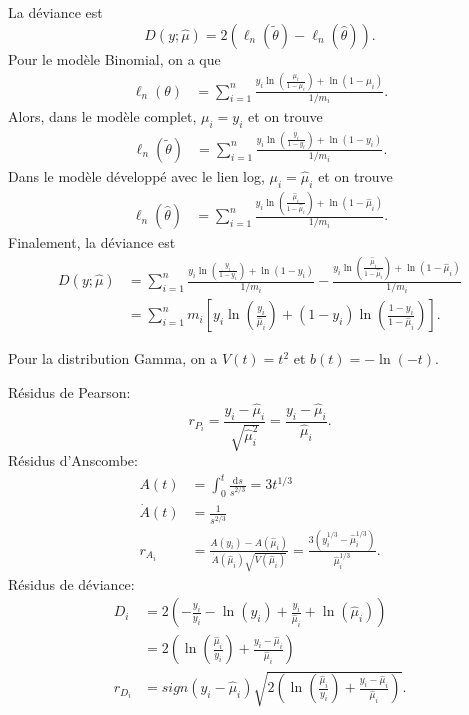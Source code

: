 \begin{solution}{2.5}
La déviance est $$D(y;\hat{\mu})=2(\ell_n(\tilde{\theta})-\ell_n(\hat{\theta})).$$ Pour le modèle Binomial, on a que
\begin{align*}
\ell_n(\theta)&=\sum_{i=1}^n\frac{y_i\ln\left(\frac{\mu_i}{1-\mu_i}\right)+\ln(1-\mu_i)}{1/m_i}.
\end{align*} Alors, dans le modèle complet, $\mu_i=y_i$ et on trouve
\begin{align*}
\ell_n(\tilde{\theta})&=\sum_{i=1}^n\frac{y_i\ln\left(\frac{y_i}{1-y_i}\right)+\ln(1-y_i)}{1/m_i}.
\end{align*}
Dans le modèle développé avec le lien log, $\mu_i=\hat{\mu}_i$ et on trouve
\begin{align*}
\ell_n(\hat{\theta})&=\sum_{i=1}^n\frac{y_i\ln\left(\frac{\hat{\mu}_i}{1-\hat{\mu}_i}\right)+\ln(1-\hat{\mu}_i)}{1/m_i}.
\end{align*}
Finalement, la déviance est
\begin{align*}
D(y;\hat{\mu})&=\sum_{i=1}^n\frac{y_i\ln\left(\frac{y_i}{1-y_i}\right)+\ln(1-y_i)}{1/m_i}-\frac{y_i\ln\left(\frac{\hat{\mu}_i}{1-\hat{\mu}_i}\right)+\ln(1-\hat{\mu}_i)}{1/m_i}\\
&=\sum_{i=1}^n m_i\left[y_i\ln\left(\frac{y_i}{\hat{\mu}_i}\right)+(1-y_i)\ln\left(\frac{1-y_i}{1-\hat{\mu}_i}\right)\right].
\end{align*}
\end{solution}
\begin{solution}{2.6}
Pour la distribution Gamma, on a $V(t)=t^2$ et $b(t)=-\ln(-t)$.

Résidus de Pearson: $$r_{P_i}=\frac{y_i-\hat{\mu}_i}{\sqrt{\hat{\mu}_i^2}}=\frac{y_i-\hat{\mu}_i}{\hat{\mu}_i}.$$
Résidus d'Anscombe:
\begin{align*}
A(t)&=\int_{0}^{t} \frac{\mbox{d}s}{s^{2/3}}=3t^{1/3}\\
\dot{A}(t)&=\frac{1}{s^{2/3}}\\
r_{A_i}&=\frac{A(y_i)-A(\hat{\mu}_i)}{\dot{A}(\hat{\mu}_i)\sqrt{V(\hat{\mu}_i)}}=\frac{3(y_i^{1/3}-\hat{\mu}_i^{1/3})}{\hat{\mu}_i^{1/3}}.
\end{align*}
Résidus de déviance:
\begin{align*}
D_i&=2\left(-\frac{y_i}{y_i}-\ln(y_i)+\frac{y_i}{\hat{\mu}_i}+\ln(\hat{\mu}_i)\right)\\
&=2\left(\ln\left(\frac{\hat{\mu}_i}{y_i}\right)+\frac{y_i-\hat{\mu}_i}{\hat{\mu}_i}\right)\\
r_{D_i}&=sign(y_i-\hat{\mu}_i)\sqrt{2\left(\ln\left(\frac{\hat{\mu}_i}{y_i}\right)+\frac{y_i-\hat{\mu}_i}{\hat{\mu}_i}\right)}.
\end{align*}
\end{solution}
